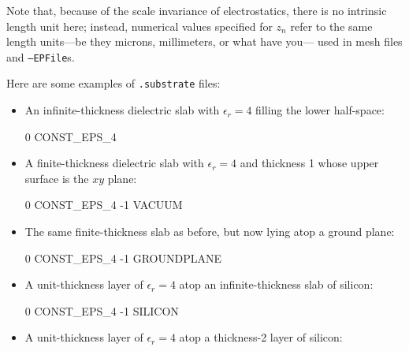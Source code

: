 \documentclass[letterpaper]{article}
\begin{document}
Note that, because of the scale invariance of electrostatics,
there is no intrinsic length unit here; instead, numerical values
specified for $z_n$ refer to the same length units---be they
microns, millimeters, or what have you--- used in mesh files 
and \texttt{--EPFile}s.

Here are some examples of \texttt{.substrate} files:

\begin{itemize}

\item An infinite-thickness dielectric slab with $\epsilon_r=4$ filling
the lower half-space:

\medskip
\begin{verbcode}
0 CONST_EPS_4
\end{verbcode}
\medskip

\item A finite-thickness dielectric slab with $\epsilon_r=4$
and thickness 1 whose upper surface is the $xy$ plane:

\medskip
\begin{verbcode}
 0 CONST_EPS_4
-1 VACUUM
\end{verbcode}

\item The same finite-thickness slab as before, but now 
lying atop a ground plane:

\medskip
\begin{verbcode}
 0 CONST_EPS_4
-1 GROUNDPLANE
\end{verbcode}
\medskip

\item A unit-thickness layer of $\epsilon_r=4$ atop an infinite-thickness
slab of silicon:

\medskip
\begin{verbcode}
 0 CONST_EPS_4
-1 SILICON
\end{verbcode}

\item A unit-thickness layer of $\epsilon_r=4$ atop a thickness-2 layer 
of silicon:


\end{itemize}
\end{document}
